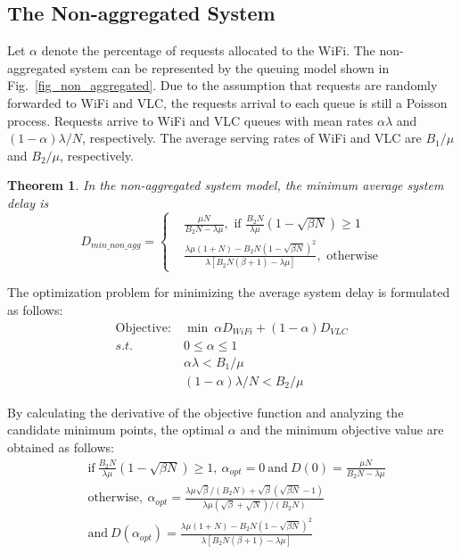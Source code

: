 \documentclass[10pt,journal]{IEEEtran}
\newtheorem{theorem}{Theorem}
\begin{document}
\subsection{The Non-aggregated System}
Let $\alpha$ denote the percentage of requests allocated to the WiFi. The non-aggregated system can be represented by the queuing model shown in Fig.~\ref{fig_non_aggregated}. Due to the assumption that requests are randomly forwarded to WiFi and VLC, the requests arrival to each queue is still a Poisson process. Requests arrive to WiFi and VLC queues with mean rates $\alpha\lambda$ and $(1-\alpha)\lambda/N$, respectively. The average serving rates of WiFi and VLC are $B_{1}/\mu$ and $B_{2}/\mu$, respectively.

\begin{theorem}
In the non-aggregated system model, the minimum average system delay is
\vspace{-0.1cm}
\begin{displaymath}
D_{min\_non\_agg}=\left\{ \begin{array}{rl}
&\frac{\mu N}{B_{2}N-\lambda\mu}, \mbox{ if $\frac{B_{2}N}{\lambda\mu}(1-\sqrt{\beta N})\geq1$}\\
&\frac{\lambda\mu(1+N)-B_{2}N(1-\sqrt{\beta N})^{2}}{\lambda[B_{2}N(\beta+1)-\lambda\mu]}, \mbox{ otherwise}
\end{array}\right.
\end{displaymath}
\end{theorem}

\begin{IEEEproof}
The optimization problem for minimizing the average system delay is formulated as follows:
\vspace{-0.1cm}
\begin{align}
\text{Objective:}~&\min~\alpha D_{WiFi}+(1-\alpha)D_{VLC}\nonumber\\
s.t.~&0\leq\alpha\leq1\nonumber\\
&\alpha\lambda<B_{1}/\mu\nonumber\\
&(1-\alpha)\lambda/N<B_{2}/\mu\nonumber
\end{align}

By calculating the derivative of the objective function and analyzing the candidate minimum points, the optimal $\alpha$ and the minimum objective value are obtained as follows:
\begin{align}
&\text{if}~\frac{B_{2}N}{\lambda\mu}(1-\sqrt{\beta N})\geq1,~\alpha_{opt}=0~\text{and}~D(0)=\frac{\mu N}{B_{2}N-\lambda\mu}\nonumber\\
&\text{otherwise},~\alpha_{opt}=\frac{\lambda\mu\sqrt{\beta}/(B_{2}N)+\sqrt{\beta}(\sqrt{\beta N}-1)}{\lambda\mu(\sqrt{\beta}+\sqrt{N})/(B_{2}N)}\nonumber\\
&\text{and}~D(\alpha_{opt})=\frac{\lambda\mu(1+N)-B_{2}N(1-\sqrt{\beta N})^{2}}{\lambda[B_{2}N(\beta+1)-\lambda\mu]}\nonumber
\end{align}
\end{IEEEproof}
\end{document}
